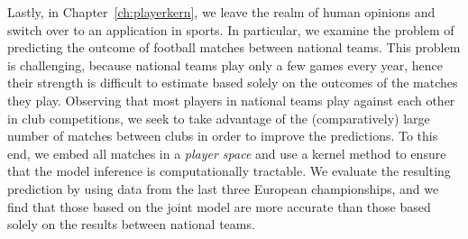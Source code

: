 Lastly, in Chapter~\ref{ch:playerkern}, we leave the realm of human opinions and switch over to an application in sports.
In particular, we examine the problem of predicting the outcome of football matches between national teams.
This problem is challenging, because national teams play only a few games every year, hence their strength is difficult to estimate based solely on the outcomes of the matches they play.
Observing that most players in national teams play against each other in club competitions, we seek to take advantage of the (comparatively) large number of matches between clubs in order to improve the predictions.
To this end, we embed all matches in a \emph{player space} and use a kernel method to ensure that the model inference is computationally tractable.
We evaluate the resulting prediction by using data from the last three European championships, and we find that those based on the joint model are more accurate than those based solely on the results between national teams.
